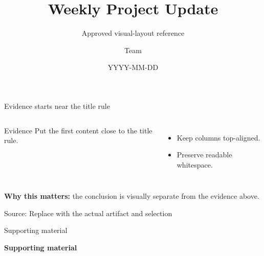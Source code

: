 \documentclass[aspectratio=169,10pt,t]{beamer}
\title{Weekly Project Update}
\subtitle{Approved visual-layout reference}
\author{Team}
\date{YYYY-MM-DD}
\newcommand{\source}[1]{\par\vfill{\color{slate}\footnotesize Source: #1}\vspace{-0.18cm}}
\begin{document}
\begin{frame}[plain]
  \titlepage
\end{frame}

\begin{frame}{Evidence starts near the title rule}
  \begin{columns}[T,onlytextwidth]
      \begin{block}{Evidence}
        Put the first content close to the title rule.
      \end{block}
      \begin{itemize}
        \item Keep columns top-aligned.
        \item Preserve readable whitespace.
      \end{itemize}
  \end{columns}
  \vspace{0.18cm}

  \textbf{Why this matters:} the conclusion is visually separate from the evidence above.
  \source{Replace with the actual artifact and selection}
\end{frame}

\appendix
{
\begin{frame}[plain]{Supporting material}
  \centering
  \vfill
  \par
  \vspace{0.40cm}
  {\color{berkeleyblue}\bfseries\fontsize{30}{36}\selectfont Supporting material}\par
  \vspace{0.40cm}
  \vfill
\end{frame}
}
\end{document}
